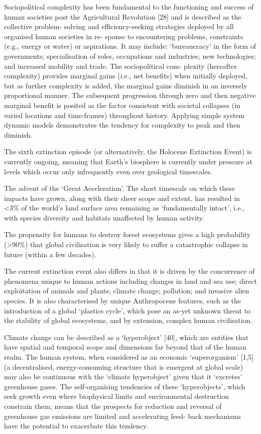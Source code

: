 \documentclass[
]{book}
\begin{document}
Sociopolitical complexity has been fundamental to the functioning and success of human
societies post the Agricultural Revolution {[}28{]} and is described as the collective problem-
solving and efficiency-seeking strategies deployed by all organised human societies in re-
sponse to encountering problems, constraints (e.g., energy or water) or aspirations. It may
include: `bureaucracy' in the form of governments; specialisation of roles, occupations and
industries; new technologies; and increased mobility and trade. The sociopolitical com-
plexity (hereafter complexity) provides marginal gains (i.e., net benefits) when initially
deployed, but as further complexity is added, the marginal gains diminish in an inversely
proportional manner. The subsequent progression through zero and then negative marginal
benefit is posited as the factor consistent with societal collapses (in varied locations and time-frames) throughout history.
Applying simple system dynamic models demonstrates the tendency for
complexity to peak and then diminish.

The sixth extinction episode (or alternatively, the
Holocene Extinction Event) is currently ongoing, meaning that Earth's biosphere is
currently under pressure at levels which occur only infrequently even over geological
timescales.

The advent of the `Great Acceleration'.
The short timescale on which these impacts have grown, along with their sheer scope and
extent, has resulted in \textless3\% of the world's land surface area remaining as `fundamentally
intact', i.e., with species diversity and habitats unaffected by human activity.

The propensity for humans to destroy forest ecosystems gives a high probability (\textgreater90\%)
that global civilisation is very likely to suffer a catastrophic collapse in future (within a few decades).

The current extinction event also differs in that it is driven by the concurrence
of phenomena unique to human actions including changes in land and sea use; direct
exploitation of animals and plants; climate change; pollution; and invasive alien species.
It is also characterised by unique Anthropocene features, such as the introduction of a
global `plastics cycle', which pose an as-yet unknown threat to the stability of global
ecosystems, and by extension, complex human civilisation.

Climate change can be described as a `hyperobject' {[}40{]}, which
are entities that have spatial and temporal scope and dimensions far beyond that of the
human realm. The human system, when considered as an economic `superorganism' {[}1,5{]}
(a decentralised, energy-consuming structure that is emergent at global scale) may also be
continuous with the `climate hyperobject' given that it `excretes' greenhouse gases.
The self-organising tendencies of these `hyperobjects', which seek growth even where
biophysical limits and environmental destruction constrain them, means that the prospects
for reduction and reversal of greenhouse gas emissions are limited and accelerating feed-
back mechanisms have the potential to exacerbate this tendency.
\end{document}
